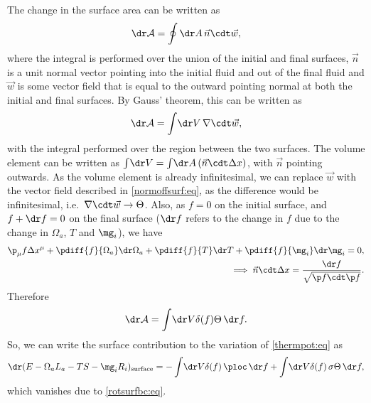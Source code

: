 The change in the surface area can be written as
%
\begin{equation*}
  \dr\mathcal{A} = \oint\dr A\, \vec{n}\cdt\vec{w},
\end{equation*}
%
where the integral is performed over the union of the initial and final surfaces, $\vec{n}$ is a unit normal vector pointing into the initial fluid and out of the final fluid and $\vec{w}$ is some vector field that is equal to the outward pointing normal at both the initial and final surfaces. By Gauss' theorem, this can be written as
%
\begin{equation*}
  \dr\mathcal{A} = \int\!\dr V\, \nabla\cdt\vec{w},
\end{equation*}
%
with the integral performed over the region between the two surfaces. The volume element can be written as $\int\!\dr V = \int\!\dr A\,(\vec{n}\cdt\Delta x)$, with $\vec{n}$ pointing outwards. As the volume element is already infinitesimal, we can replace $\vec{w}$ with the vector field described in \eqref{normoffsurf:eq}, as the difference would be infinitesimal, i.e.\ $\nabla\cdt\vec{w} \to \Theta$. Also, as $f=0$ on the initial surface, and $f+\dr f=0$ on the final surface ($\dr f$ refers to the change in $f$ due to the change in $\Omega_a$, $T$ and $\mg_i$), we have
%
\begin{equation*}
\begin{split}
  \p_\mu f \Delta x^\mu + \pdiff{f}{\Omega_a}\dr\Omega_a + \pdiff{f}{T}\dr T + \pdiff{f}{\mg_i}\dr\mg_i = 0,\\
  \implies \vec{n}\cdt\Delta x = \frac{\dr f}{\sqrt{\p f\cdt\p f}}.
\end{split}
\end{equation*}
%
Therefore
%
\begin{equation*}
  \dr\mathcal{A} = \int\!\dr V \delta(f) \Theta \,\dr f.
\end{equation*}
%
So, we can write the surface contribution to the variation of \eqref{thermpot:eq} as
%
\begin{equation*}
  \dr(E -\Omega_a L_a - T S - \mg_i R_i)_{\text{surface}}
  =-\int\!\dr V \delta(f) \,\ploc \,\dr f + \int\!\dr V \delta(f)\,\sigma \Theta \,\dr f,
\end{equation*}
%
which vanishes due to \eqref{rotsurfbc:eq}.

